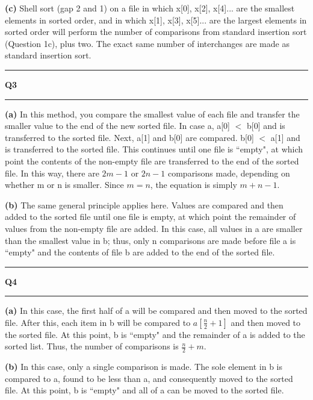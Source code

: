 \documentclass[11pt]{article}
\newcommand\question[2]{\vspace{.25in}\hrule\textbf{#1 #2}\vspace{.5em}\hrule\vspace{.10in}}
\renewcommand\part[1]{\vspace{.10in}\textbf{(#1)}}
\begin{document}
\part{c} Shell sort (gap 2 and 1) on a file in which x[0], x[2], x[4]... are the smallest elements in sorted order, and in which x[1], x[3], x[5]... are the largest elements in sorted order will perform the number of comparisons from standard insertion sort (Question 1c), plus two. The exact same number of interchanges are made as standard insertion sort.

\question{Q3}{}
\part{a} In this method, you compare the smallest value of each file and transfer the smaller value to the end of the new sorted file. In case a, a[0] $<$ b[0] and is transferred to the sorted file. Next, a[1] and b[0] are compared. b[0] $<$ a[1] and is transferred to the sorted file. This continues until one file is ``empty", at which point the contents of the non-empty file are transferred to the end of the sorted file. In this way, there are $2m-1$ or $2n-1$ comparisons made, depending on whether m or n is smaller. Since $m = n$, the equation is simply $m+n-1$.

\part{b} The same general principle applies here. Values are compared and then added to the sorted file until one file is empty, at which point the remainder of values from the non-empty file are added. In this case, all values in a are smaller than the smallest value in b; thus, only n comparisons are made before file a is ``empty" and the contents of file b are added to the end of the sorted file.

\question{Q4}{}
\part{a} In this case, the first half of a will be compared and then moved to the sorted file. After this, each item in b will be compared to $a[\frac{n}{2} + 1]$ and then moved to the sorted file. At this point, b is ``empty" and the remainder of a is added to the sorted list. Thus, the number of comparisons is $\frac{n}{2} + m$.

\part{b} In this case, only a single comparison is made. The sole element in b is compared to a, found to be less than a, and consequently moved to the sorted file. At this point, b is ``empty" and all of a can be moved to the sorted file.
\end{document}
